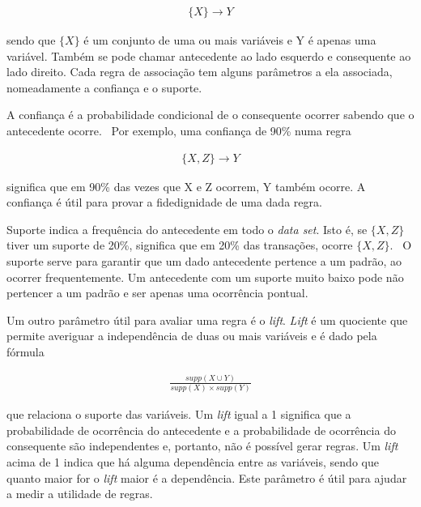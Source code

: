 \begin{align*}
\{X\} \rightarrow Y 
\end{align*}

sendo que $\{X\}$ é um conjunto de uma ou mais variáveis e Y é apenas uma variável. Também se pode chamar antecedente ao lado esquerdo e consequente ao lado direito. Cada regra de associação tem alguns parâmetros a ela associada, nomeadamente a confiança e o suporte.

A confiança é a probabilidade condicional de o consequente ocorrer sabendo que o antecedente ocorre.~\cite{apriori} Por exemplo, uma confiança de 90\% numa regra 

\begin{align*}
\{X, Z\} \rightarrow Y  
\end{align*}

significa que em 90\% das vezes que X e Z ocorrem, Y também ocorre. A confiança é útil para provar a fidedignidade de uma dada regra.

Suporte indica a frequência do antecedente em todo o \textit{data set}. Isto é, se $ \{X, Z\} $ tiver um suporte de 20\%, significa que em 20\% das transações, ocorre $\{X, Z\}$.~\cite{apriori} O suporte serve para garantir que um dado antecedente pertence a um padrão, ao ocorrer frequentemente. Um antecedente com um suporte muito baixo pode não pertencer a um padrão e ser apenas uma ocorrência pontual.

Um outro parâmetro útil para avaliar uma regra é o \textit{lift}. \textit{Lift} é um quociente que permite averiguar a independência de duas ou mais variáveis e é dado pela fórmula 

\begin{align*}
\frac{supp(X\cup Y)}{supp(X)\times supp(Y)}
\end{align*}

que relaciona o suporte das variáveis. Um \textit{lift} igual a 1 significa que a probabilidade de ocorrência do antecedente e a probabilidade de ocorrência do consequente são independentes e, portanto, não é possível gerar regras. Um \textit{lift} acima de 1 indica que há alguma dependência entre as variáveis, sendo que quanto maior for o \textit{lift} maior é a dependência. Este parâmetro é útil para ajudar a medir a utilidade de regras.

